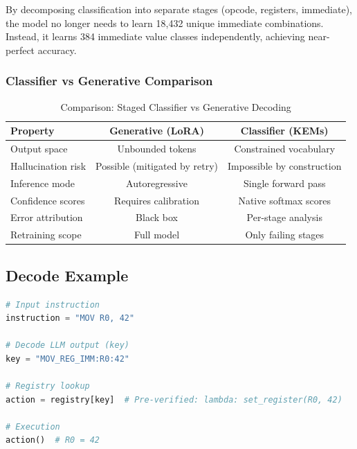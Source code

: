 \documentclass[11pt,a4paper]{article}
\begin{document}
By decomposing classification into separate stages (opcode, registers, immediate), the model no longer needs to learn 18,432 unique immediate combinations. Instead, it learns 384 immediate value classes independently, achieving near-perfect accuracy.

\subsubsection{Classifier vs Generative Comparison}

\begin{table}[H]
\centering
\caption{Comparison: Staged Classifier vs Generative Decoding}
\label{tab:classifier-vs-generative}
\begin{tabular}{@{}lcc@{}}
\toprule
\textbf{Property} & \textbf{Generative (LoRA)} & \textbf{Classifier (KEMs)} \\
\midrule
Output space & Unbounded tokens & Constrained vocabulary \\
Hallucination risk & Possible (mitigated by retry) & Impossible by construction \\
Inference mode & Autoregressive & Single forward pass \\
Confidence scores & Requires calibration & Native softmax scores \\
Error attribution & Black box & Per-stage analysis \\
Retraining scope & Full model & Only failing stages \\
\bottomrule
\end{tabular}
\end{table}

\subsection{Decode Example}

\begin{lstlisting}[language=Python, caption=Decode LLM Operation]
# Input instruction
instruction = "MOV R0, 42"

# Decode LLM output (key)
key = "MOV_REG_IMM:R0:42"

# Registry lookup
action = registry[key]  # Pre-verified: lambda: set_register(R0, 42)

# Execution
action()  # R0 = 42
\end{lstlisting}

\end{document}
